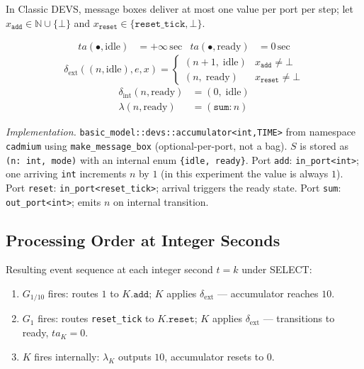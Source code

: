 In Classic DEVS, message boxes deliver at most one value per port per
step; let $x_{\texttt{add}} \in \mathbb{N} \cup \{\bot\}$ and
$x_{\texttt{reset}} \in \{\texttt{reset\_tick}, \bot\}$.

\begin{align*}
  ta(\bullet, \text{idle})  &= +\infty\,\text{sec}
  & ta(\bullet, \text{ready}) &= 0\,\text{sec}
\end{align*}
\[
  \delta_{\text{ext}}((n, \text{idle}), e, x) =
    \begin{cases}
      (n + 1,\; \text{idle})  & x_{\texttt{add}} \neq \bot \\
      (n,\;     \text{ready}) & x_{\texttt{reset}} \neq \bot
    \end{cases}
\]
\begin{align*}
  \delta_{\text{int}}(n, \text{ready}) &= (0,\; \text{idle}) \\[4pt]
  \lambda(n, \text{ready}) &= (\texttt{sum}: n)
\end{align*}

\noindent\textit{Implementation.}
\texttt{basic\_model::devs::accumulator<int,TIME>}
from namespace \texttt{cadmium} using \texttt{make\_message\_box}
(optional-per-port, not a bag).
$S$ is stored as \texttt{(n:~int,~mode)} with an internal enum
\texttt{\{idle,~ready\}}.
Port \texttt{add}: \texttt{in\_port<int>}; one arriving \texttt{int}
increments $n$ by $1$ (in this experiment the value is always $1$).
Port \texttt{reset}: \texttt{in\_port<reset\_tick>}; arrival triggers
the ready state.
Port \texttt{sum}: \texttt{out\_port<int>}; emits $n$ on internal
transition.

\subsection*{Processing Order at Integer Seconds}

Resulting event sequence at each integer second $t = k$ under SELECT:
\begin{enumerate}
  \item $G_{1/10}$ fires: routes $1$ to $K.\texttt{add}$;
        $K$ applies $\delta_{\text{ext}}$ --- accumulator reaches $10$.
  \item $G_{1}$ fires: routes \texttt{reset\_tick} to $K.\texttt{reset}$;
        $K$ applies $\delta_{\text{ext}}$ --- transitions to ready,
        $ta_K = 0$.
  \item $K$ fires internally: $\lambda_K$ outputs $10$, accumulator
        resets to $0$.
\end{enumerate}

